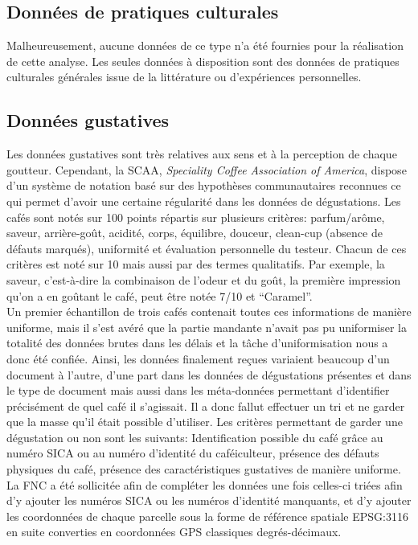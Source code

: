 \subsection{Données de pratiques culturales}
Malheureusement, aucune données de ce type n'a été fournies pour la réalisation de cette analyse. Les seules données à disposition sont des données de pratiques culturales générales issue de la littérature ou d'expériences personnelles.

\subsection{Données gustatives}
Les données gustatives sont très relatives aux sens et à la perception de chaque goutteur. Cependant, la SCAA, \textit{Speciality Coffee Association of America}, dispose d’un système de notation basé sur des hypothèses communautaires reconnues ce qui permet d’avoir une certaine régularité dans les données de dégustations. Les cafés sont notés sur 100 points répartis sur plusieurs critères: parfum/arôme, saveur, arrière-goût, acidité, corps, équilibre, douceur, clean-cup (absence de défauts marqués), uniformité et évaluation personnelle du testeur.  Chacun de ces critères est noté sur 10 mais aussi par des termes qualitatifs. Par exemple, la saveur, c’est-à-dire la combinaison de l’odeur et du goût, la première impression qu’on a en goûtant le café, peut être notée 7/10 et “Caramel”. \\

\noindent Un premier échantillon de trois cafés contenait toutes ces informations de manière uniforme, mais il s'est avéré que la partie mandante n'avait pas pu uniformiser la totalité des données brutes dans les délais et la tâche d'uniformisation nous a donc été confiée. Ainsi, les données finalement reçues variaient beaucoup d'un document à l'autre, d'une part dans les données de dégustations présentes et dans le type de document mais aussi dans les méta-données permettant d'identifier précisément de quel café il s'agissait. Il a donc fallut effectuer un tri et ne garder que la masse qu'il était possible d'utiliser. Les critères permettant de garder une dégustation ou non sont les suivants: Identification possible du café grâce au numéro SICA ou au numéro d'identité du caféiculteur, présence des défauts physiques du café, présence des caractéristiques gustatives de manière uniforme. La FNC a été sollicitée afin de compléter les données une fois celles-ci triées afin d'y ajouter les numéros SICA ou les numéros d'identité manquants, et d'y ajouter les coordonnées de chaque parcelle sous la forme de référence spatiale EPSG:3116 en suite converties en coordonnées GPS classiques degrés-décimaux.\\

